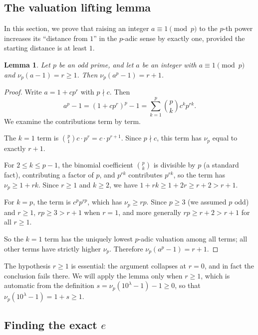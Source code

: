 \documentclass[12pt]{amsart}
\newtheorem{lemma}[theorem]{Lemma}
\theoremstyle{definition}
\theoremstyle{remark}
\begin{document}
\subsection{The valuation lifting lemma}\label{subsec:lifting}

In this section, we prove that raising 
an integer $a \equiv 1 \pmod{p}$ to the $p$-th power increases its 
``distance from $1$'' in the $p$-adic sense by exactly one, provided 
the starting distance is at least $1$.

\begin{lemma}\label{lem:lifting}
Let $p$ be an odd prime, and let $a$ be an integer with $a \equiv 1 
\pmod{p}$ and $\nu_p(a - 1) = r \ge 1$. Then $\nu_p(a^p - 1) = r + 1$.
\end{lemma}

\begin{proof}
Write $a = 1 + c p^r$ with $p \nmid c$. Then
\[
  a^p - 1 = (1 + c p^r)^p - 1 = \sum_{k=1}^{p} \binom{p}{k} c^k p^{rk}.
\]
We examine the contributions term by term.

The $k = 1$ term is $\binom{p}{1} c \cdot p^r = c \cdot p^{r+1}$. 
Since $p \nmid c$, this term has $\nu_p$ equal to exactly $r + 1$.

For $2 \le k \le p - 1$, the binomial coefficient $\binom{p}{k}$ is 
divisible by $p$ (a standard fact), contributing a factor of $p$, and 
$p^{rk}$ contributes $p^{rk}$, so the term has $\nu_p \ge 1 + rk$. 
Since $r \ge 1$ and $k \ge 2$, we have $1 + rk \ge 1 + 2r \ge r + 2 > 
r + 1$.

For $k = p$, the term is $c^p p^{rp}$, which has $\nu_p \ge rp$. Since 
$p \ge 3$ (we assumed $p$ odd) and $r \ge 1$, $rp \ge 3 > r + 1$ when 
$r = 1$, and more generally $rp \ge r + 2 > r + 1$ for all $r \ge 1$.

So the $k = 1$ term has the uniquely lowest $p$-adic valuation among 
all terms; all other terms have strictly higher $\nu_p$. Therefore 
$\nu_p(a^p - 1) = r + 1$.
\end{proof}

The hypothesis $r \ge 1$ is essential: the argument collapses at 
$r = 0$, and in fact the conclusion fails there. We will apply the 
lemma only when $r \ge 1$, which is automatic from the 
definition $s = \nu_p(10^\lambda - 1) - 1 \ge 0$, so that 
$\nu_p(10^\lambda - 1) = 1 + s \ge 1$.

\subsection{Finding the exact $e$}\label{subsec:pinning}
\end{document}
